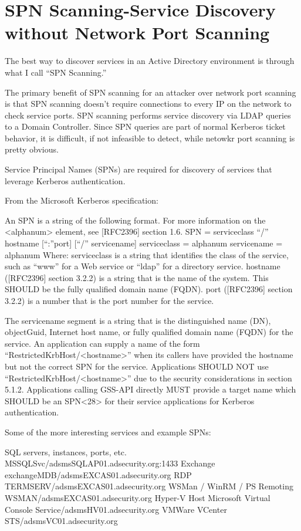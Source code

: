 \chapter{SPN Scanning-Service Discovery without Network Port Scanning}

The best way to discover services in an Active Directory environment is through what I call “SPN Scanning.”

The primary benefit of SPN scanning for an attacker over network port scanning is that SPN scanning doesn’t require connections to every IP on the network to check service ports. SPN scanning performs service discovery via LDAP queries to a Domain Controller. Since SPN queries are part of normal Kerberos ticket behavior, it is difficult, if not infeasible to detect, while netowkr port scanning is pretty obvious.

Service Principal Names (SPNs) are required for discovery of services that leverage Kerberos authentication.


From the Microsoft Kerberos specification:

An SPN is a string of the following format. For more information on the <alphanum> element, see [RFC2396] section 1.6.
SPN = serviceclass “/” hostname [“:”port] [“/” servicename]
serviceclass = alphanum
servicename = alphanum
Where:
serviceclass is a string that identifies the class of the service, such as “www” for a Web service or “ldap” for a directory service.
hostname ([RFC2396] section 3.2.2) is a string that is the name of the system. This SHOULD be the fully qualified domain name (FQDN).
port ([RFC2396] section 3.2.2) is a number that is the port number for the service.

The servicename segment is a string that is the distinguished name (DN), objectGuid, Internet host name, or fully qualified domain name (FQDN) for the service.
An application can supply a name of the form “RestrictedKrbHost/<hostname>” when its callers have provided the hostname but not the correct SPN for the service. Applications SHOULD NOT use “RestrictedKrbHost/<hostname>” due to the security considerations in section 5.1.2. Applications calling GSS-API directly MUST provide a target name which SHOULD be an SPN<28> for their service applications for Kerberos authentication.

Some of the more interesting services and example SPNs:

SQL servers, instances, ports, etc.
MSSQLSvc/adsmsSQLAP01.adsecurity.org:1433
Exchange
exchangeMDB/adsmsEXCAS01.adsecurity.org
RDP
TERMSERV/adsmsEXCAS01.adsecurity.org
WSMan / WinRM / PS Remoting
WSMAN/adsmsEXCAS01.adsecurity.org
Hyper-V Host
Microsoft Virtual Console Service/adsmsHV01.adsecurity.org
VMWare VCenter
STS/adsmsVC01.adsecurity.org


